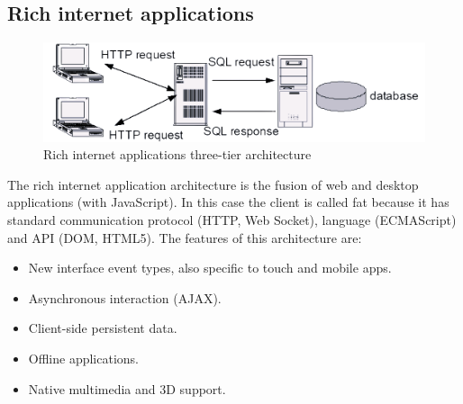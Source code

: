 \documentclass[12pt, a4paper]{report}
\newtheorem[style=M,bodystyle=\normalfont]{theorem}{Theorem}
\newtheorem[style=M,bodystyle=\normalfont]{corollary}{Corollary}
\newtheorem[style=M,bodystyle=\normalfont]{lemma}{Lemma}
\newtheorem[style=M,bodystyle=\normalfont]{definition}{Definition}
\begin{document}
    \subsection{Rich internet applications}
    \begin{figure}[H]
        \centering
        \includegraphics[width=0.5\linewidth]{images/ttria.png}
        \caption{Rich internet applications three-tier architecture}
    \end{figure}
    The rich internet application architecture is the fusion of web and desktop applications (with JavaScript). 
    In this case the client is called fat because it has standard communication protocol (HTTP, Web Socket), language (ECMAScript) and API (DOM, HTML5). 
    The features of this architecture are: 
    \begin{itemize}
        \item New interface event types, also specific to touch and mobile apps.
        \item Asynchronous interaction (AJAX).
        \item Client-side persistent data.
        \item Offline applications.
        \item Native multimedia and 3D support.
    \end{itemize}
\end{document}

